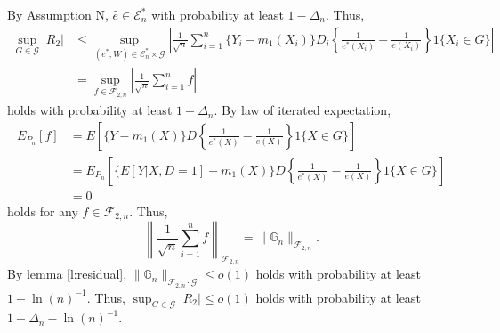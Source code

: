\documentclass[12pt,oneside,reqno,english]{amsart}
\theoremstyle{definition}
\begin{document}
By Assumption N, 
$\hat{e}\in \mathcal{E}^{*}_{n}$
with probability at least $1-\Delta_{n}$. Thus,  
\begin{align*}
\sup_{G\in\mathcal{G}}|R_{2}| &\leq \sup_{(e^{*},W)\in \mathcal{E}^{*}_{n}\times \mathcal{G}}\left|\frac{1}{\sqrt{n}}\sum_{i=1}^{n}\{Y_{i}-m_{1}(X_{i})\}D_{i}\left\{\frac{1}{e^{*}(X_{i})}-\frac{1}{e(X_{i})}\right\}1\{X_{i}\in G\}\right|\\
&=\sup_{f\in\mathcal{F}_{2,n}}\left|\frac{1}{\sqrt{n}}\sum_{i=1}^{n}f\right|
\end{align*}
holds with probability at least $1-\Delta_{n}$. By law of iterated expectation,  
\begin{align*}
E_{P_{n}}[f]&=E\left[\{Y-m_{1}(X)\}D\left\{\frac{1}{e^{*}(X)}-\frac{1}{e(X)}\right\}1\{X\in G\}\right]\\
&=E_{P_{n}}\left[\{E[Y|X,D=1]-m_{1}(X)\}D\left\{\frac{1}{e^{*}(X)}-\frac{1}{e(X)}\right\}1\{X\in G\}\right]\\
&=0
\end{align*}
holds for any $f\in \mathcal{F}_{2,n}$. Thus, 
\[\left\|\frac{1}{\sqrt{n}}\sum_{i=1}^{n}f\right\|_{\mathcal{F}_{2,n}}=\|\mathbb{G}_{n}\|_{\mathcal{F}_{2,n}}.\]
By lemma \ref{l:residual}, 
$\|\mathbb{G}_{n}\|_{\mathcal{F}_{2,n}\cdot \mathcal{G}}\leq o(1)$
holds with probability at least $1-\ln(n)^{-1}$. 
Thus, $\sup_{G\in \mathcal{G}}|R_{2}|\leq o(1)$ holds with probability at least $1-\Delta_{n}-\ln(n)^{-1}$. 
\end{document}
